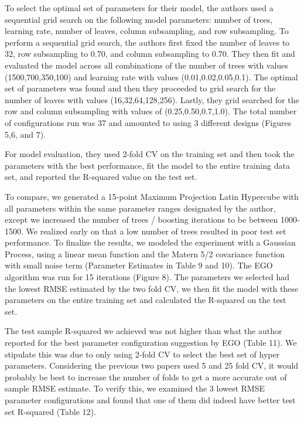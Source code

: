 \documentclass[12pt]{article}
\begin{document}
          	To select the optimal set of parameters for their model, the authors used a sequential grid search on the following model parameters: number of trees, learning rate, number of leaves, column subsampling, and row subsampling. To perform a sequential grid search, the authors first fixed the number of leaves to 32, row subsampling to 0.70, and column subsampling to 0.70. They then fit and evaluated the model across all combinations of the number of trees with values (1500,700,350,100) and learning rate with values (0.01,0.02,0.05,0.1). The optimal set of parameters was found and then they proceeded to grid search for the number of leaves with values (16,32,64,128,256). Lastly, they grid searched for the row and column subsampling with values of (0.25,0.50,0.7,1.0). The total number of configurations run was 37 and amounted to using 3 different designs (Figures 5,6, and 7).
          	
 For model evaluation, they used 2-fold CV on the training set and then took the parameters with the best performance, fit the model to the entire training data set, and reported the R-squared value on the test set.
 
To compare, we generated a 15-point Maximum Projection Latin Hypercube with all parameters within the same parameter ranges designated by the author, except we increased the number of trees / boosting iterations to be between 1000-1500. We realized early on that a low number of trees resulted in poor test set performance. To finalize the results, we modeled the experiment with a Gaussian Process, using a linear mean function and the Matern 5/2 covariance function with small noise term (Parameter Estimates in Table 9 and 10). The EGO algorithm was run for 15 iterations (Figure 8). The parameters we selected had the lowest RMSE estimated by the two fold CV, we then fit the model with these parameters on the entire training set and calculated the R-squared on the test set. 
 
The test sample R-squared we achieved was not higher than what the author reported for the best parameter configuration suggestion by EGO (Table 11). We stipulate this was due to only using 2-fold CV to select the best set of hyper parameters. Considering the previous two papers used 5 and 25 fold CV, it would probably be best to increase the number of folds to get a more accurate out of sample RMSE estimate. To verify this, we examined the 3 lowest RMSE parameter configurations and found that one of them did indeed have better test set R-squared (Table 12). 
\end{document}
